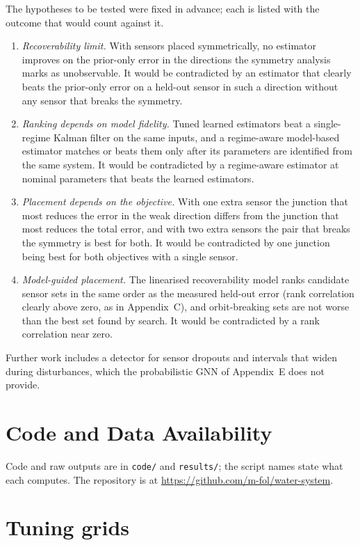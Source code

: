\documentclass[conference]{IEEEtran}
\begin{document}
The hypotheses to be tested were fixed in advance; each is listed with the outcome that would count against it.
\begin{enumerate}
\item \emph{Recoverability limit.} With sensors placed symmetrically, no estimator improves on the prior-only error in the directions the symmetry analysis marks as unobservable. It would be contradicted by an estimator that clearly beats the prior-only error on a held-out sensor in such a direction without any sensor that breaks the symmetry.
\item \emph{Ranking depends on model fidelity.} Tuned learned estimators beat a single-regime Kalman filter on the same inputs, and a regime-aware model-based estimator matches or beats them only after its parameters are identified from the same system. It would be contradicted by a regime-aware estimator at nominal parameters that beats the learned estimators.
\item \emph{Placement depends on the objective.} With one extra sensor the junction that most reduces the error in the weak direction differs from the junction that most reduces the total error, and with two extra sensors the pair that breaks the symmetry is best for both. It would be contradicted by one junction being best for both objectives with a single sensor.
\item \emph{Model-guided placement.} The linearised recoverability model ranks candidate sensor sets in the same order as the measured held-out error (rank correlation clearly above zero, as in Appendix~C), and orbit-breaking sets are not worse than the best set found by search. It would be contradicted by a rank correlation near zero.
\end{enumerate}
Further work includes a detector for sensor dropouts and intervals that widen during disturbances, which the probabilistic GNN of Appendix~E does not provide.

\section*{Code and Data Availability}
Code and raw outputs are in \texttt{code/} and \texttt{results/}; the script names state what each computes. The repository is at \url{https://github.com/m-fol/water-system}.

\appendices

\section{Tuning grids}
\end{document}
